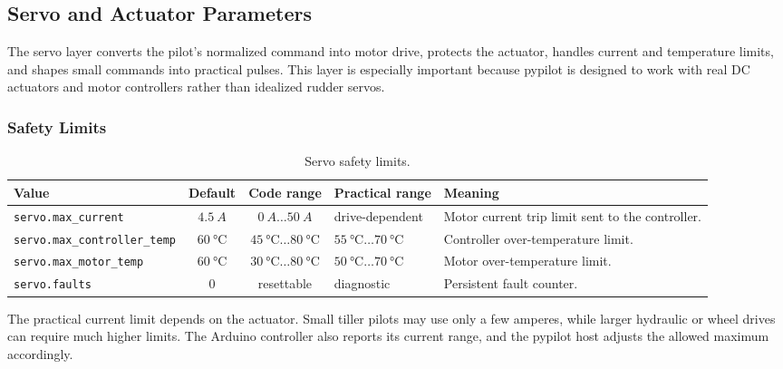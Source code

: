 \documentclass[11pt,twocolumn]{article}
\begin{document}
\subsection{Servo and Actuator Parameters}
The servo layer converts the pilot's normalized command into motor drive,
protects the actuator, handles current and temperature limits, and shapes
small commands into practical pulses.  This layer is especially important
because pypilot is designed to work with real DC actuators and motor
controllers rather than idealized rudder servos.
\subsubsection{Safety Limits}
\begin{table}[t]
\centering
\caption{Servo safety limits.}
\label{tab:pypilot-servo-safety}
\begin{tabularx}{\textwidth}{Z{0.23\textwidth}c c Z{0.16\textwidth}Y}
\toprule
Value & Default & Code range & Practical range & Meaning \\
\midrule
\texttt{servo.max\_current} &
\(\SI{4.5}{A}\) &
\(\SI{0}{A}\ldots\SI{50}{A}\) &
drive-dependent &
Motor current trip limit sent to the controller. \\
\texttt{servo.max\_controller\_temp} &
\(\SI{60}{\celsius}\) &
\(\SI{45}{\celsius}\ldots\SI{80}{\celsius}\) &
\(\SI{55}{\celsius}\ldots\SI{70}{\celsius}\) &
Controller over-temperature limit. \\
\texttt{servo.max\_motor\_temp} &
\(\SI{60}{\celsius}\) &
\(\SI{30}{\celsius}\ldots\SI{80}{\celsius}\) &
\(\SI{50}{\celsius}\ldots\SI{70}{\celsius}\) &
Motor over-temperature limit. \\
\texttt{servo.faults} &
\num{0} &
resettable &
diagnostic &
Persistent fault counter. \\
\bottomrule
\end{tabularx}
\end{table}
The practical current limit depends on the actuator.  Small tiller pilots
may use only a few amperes, while larger hydraulic or wheel drives can
require much higher limits.  The Arduino controller also reports its
current range, and the pypilot host adjusts the allowed maximum
accordingly.
\end{document}
